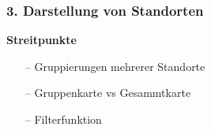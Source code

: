 \documentclass[aspectratio=1610]{beamer}
\begin{document}
	\begin{frame}[plain]
	\frametitle{3. Darstellung von Standorten}
		\begin{minipage}{0.5\textwidth}
			\setlength{\fboxsep}{0pt}%
			\setlength{\fboxrule}{1pt}%
			\captionsetup{labelformat=empty}
			\centering
		\end{minipage}%
		\begin{minipage}{0.5\textwidth}
			\textbf{Streitpunkte}
			\begin{itemize}
				\setlength\itemsep{0.3em}
				\item[--] Gruppierungen mehrerer Standorte
				\item[--] Gruppenkarte vs Gesammtkarte
				\item[--] Filterfunktion
			\end{itemize}
		\end{minipage}%
	\end{frame}

\end{document}
